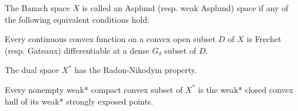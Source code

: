 \begin{definition}
  \label{def:asplund_space}
  The Banach space $X$ is called an Asplund (resp. weak Asplund) space if any of the following equivalent conditions hold:

  \begin{defenum}
    \item\cite[theorem 2.14]{Phelps1993} Every continuous convex function on a convex open subset $D$ of $X$ is Frechet (resp. Gateaux) differentiable at a dense $G_\delta$ subset of $D$.
    \item\cite[definition 5.2]{Phelps1993} The dual space $X^*$ has the Radon-Nikodym property.
    \item\cite[theorem 5.12]{Phelps1993} Every nonempty weak* compact convex subset of $X^*$ is the weak* closed convex hull of its weak* strongly exposed points.
  \end{defenum}
\end{definition}

